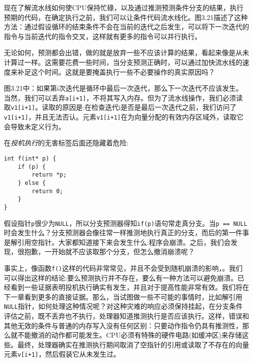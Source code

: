 

现在了解流水线如何使CPU保持忙碌，以及通过推测预测条件分支的结果，执行预期的代码，在确定执行之前，我们可以让条件代码流水线化。图3.21描述了这种方法：通过假设循环的结束条件不会在当前的迭代之后发生，可以将下一次迭代的指令与当前迭代的指令交叉，这样就有更多的指令可以并行执行。

无论如何，预测都会出错，做的就是放弃一些不应该计算的结果，看起来像是从未计算过一样。这需要花费一些时间，当分支预测正确时，可以通过加快流水线的速度来补足这个时间。这就是要掩盖执行一些不必要操作的真实原因吗？

图3.21中：如果第i次迭代是循环中最后一次迭代，那么下一次迭代不应该发生。当然，我们可以丢弃\texttt{a[i+1]}，不将其写入内存。但为了流水线操作，我们必须读取\texttt{v1[i+1]}。读取的原因是:在检查迭代i是否是最后一次迭代之前，我们访问了\texttt{v1[i+1]}，并且无法否认。元素\texttt{v1[i+1]}在为向量分配的有效内存区域外，读取它会导致未定义行为。

在\textit{投机执行}的无害标签后面还隐藏着危险:

\begin{lstlisting}[style=styleCXX]
int f(int* p) {
	if (p) {
		return *p;
	} else {
		return 0;
	}
}
\end{lstlisting}

假设指针\texttt{p}很少为\texttt{NULL}，所以分支预测器得知\texttt{if(p)}语句常走真分支。当\texttt{p == NULL}时会发生什么？分支预测器会像往常一样推测地执行真正的分支，而后的第一件事是解引用空指针。大家都知道接下来会发生什么:程序会崩溃。之后，我们会发现，很抱歉，一开始就不应该取那个分支，但怎么撤消崩溃呢？

事实上，像函数\texttt{f()}这样的代码非常常见，并且不会受到随机崩溃的影响，。我们可以得出这样的结论:要么预测执行并不存在，要么有一种方法可以避免崩溃。已经看到一些证据表明投机执行确实有发生，并且对于提高性能非常有效。我们将在下一章看到更多的直接证据。那么，当试图做一些不可能的事情时，比如解引用\texttt{NULL}指针，如何处理这种情况呢？对这种灾难的响应必须保持挂起，在分支条件评估之前，既不丢弃也不执行，处理器知道推测执行是否应该执行。这样，错误和其他无效的条件与普通的内存写入没有任何区别：只要动作指令仍具有推测性，那么就不能撤消的动作都可能发生。CPU必须有特殊的硬件电路(如缓冲区)来存储这些。最终，处理器确实在推测执行期间取消了空指针的引用或读取了不存在的向量元素\texttt{v[i+1]}，然后假装它从未发生过。

